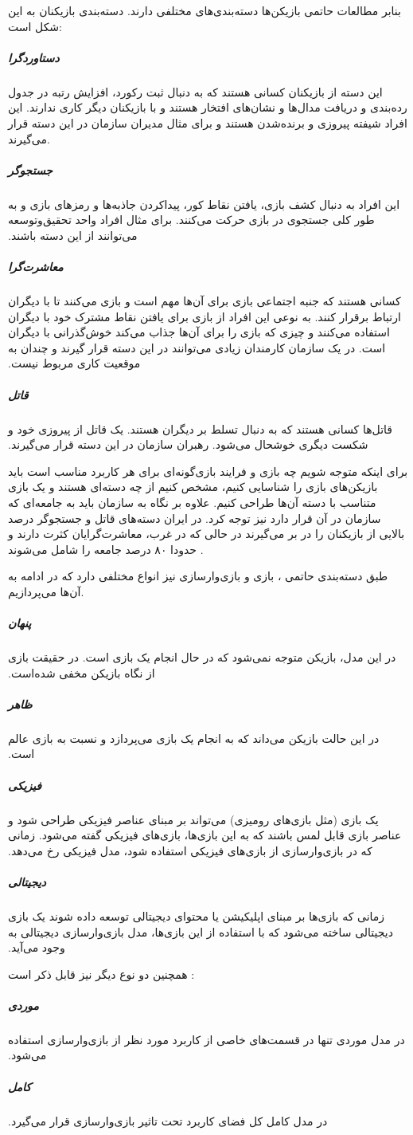 بنابر مطالعات حاتمی \cite{atoz} بازیکن‌ها دسته‌بندی‌های مختلفی دارند. دسته‌بندی بازیکنان به این شکل است:
\subparagraph{دستاوردگرا}
این دسته از بازیکنان کسانی هستند که به دنبال ثبت رکورد، افزایش رتبه در جدول رده‌بندی و دریافت مدال‌ها و نشان‌های افتخار هستند و با بازیکنان دیگر کاری ندارند. این افراد شیفته پیروزی و برنده‌شدن هستند و برای مثال مدیران سازمان در این دسته قرار می‌گیرند.
\subparagraph{جستجوگر}‫
این افراد به دنبال کشف بازی، یافتن نقاط کور، پیداکردن جاذبه‌ها و رمزهای بازی و به طور کلی جستجوی در بازی حرکت می‌کنند. برای مثال افراد واحد تحقیق‌وتوسعه می‌توانند از این دسته باشند.
\subparagraph{معاشرت‌گرا}‫
کسانی هستند که جنبه اجتماعی بازی برای آن‌ها مهم است و بازی می‌کنند تا با دیگران ارتباط برقرار کنند. به نوعی این افراد از بازی برای یافتن نقاط مشترک خود با دیگران استفاده می‌کنند و چیزی که بازی را برای آن‌ها جذاب می‌کند خوش‌گذرانی با دیگران است. در یک سازمان کارمندان زیادی می‌توانند در این دسته قرار گیرند و چندان به موقعیت کاری مربوط نیست.
\subparagraph{قاتل}‫
قاتل‌ها کسانی هستند که به دنبال تسلط بر دیگران هستند. یک قاتل از پیروزی خود و شکست دیگری خوشحال می‌شود. رهبران سازمان در این دسته قرار می‌گیرند.

برای اینکه متوجه شویم چه بازی و فرایند بازی‌گونه‌ای برای هر کاربرد مناسب است باید بازیکن‌های بازی را شناسایی کنیم، مشخص کنیم از چه دسته‌ای هستند و یک بازی متناسب با دسته آن‌ها طراحی کنیم. علاوه بر نگاه به سازمان باید به جامعه‌ای که سازمان در آن قرار دارد نیز توجه کرد. در ایران دسته‌های قاتل و جستجوگر درصد بالایی از بازیکنان را در بر می‌گیرند در حالی که در غرب، معاشرت‌گرایان کثرت دارند و حدودا ۸۰ درصد جامعه را شامل می‌شوند \cite{atoz}.

طبق دسته‌بندی حاتمی \cite{atoz}، بازی و بازی‌وارسازی نیز انواع مختلفی دارد که در ادامه به آن‌ها می‌پردازیم.
\subparagraph{پنهان}‫
در این مدل، بازیکن متوجه نمی‌شود که در حال انجام یک بازی است. در حقیقت بازی از نگاه بازیکن مخفی شده‌است.
\subparagraph{ظاهر}‫
در این حالت بازیکن می‌داند که به انجام یک بازی می‌پردازد و نسبت به بازی عالم است.
\subparagraph{فیزیکی}‫
یک بازی (مثل بازی‌های رومیزی) می‌تواند بر مبنای عناصر فیزیکی طراحی شود و عناصر بازی قابل لمس باشند که به این بازی‌ها، بازی‌های فیزیکی گفته می‌شود. زمانی که در بازی‌وارسازی از بازی‌های فیزیکی استفاده شود، مدل فیزیکی رخ می‌دهد.
\subparagraph{دیجیتالی}‫
زمانی که بازی‌ها بر مبنای اپلیکیشن یا محتوای دیجیتالی توسعه داده شوند یک بازی دیجیتالی ساخته می‌شود که با استفاده از این بازی‌ها، مدل بازی‌وارسازی دیجیتالی به وجود می‌آید.

همچنین دو نوع دیگر نیز قابل ذکر است \cite{killer}:

\subparagraph{موردی}‫
در مدل موردی تنها در قسمت‌های خاصی از کاربرد مورد نظر از بازی‌وارسازی استفاده می‌شود.
\subparagraph{کامل}‫
در مدل کامل کل فضای کاربرد تحت تاثیر بازی‌وارسازی قرار می‌گیرد.

